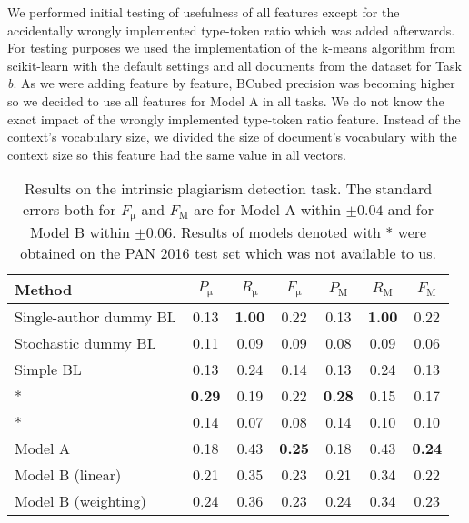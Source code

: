 \documentclass[10pt, a4paper]{article}
\begin{document}
We performed initial testing of usefulness of all features except for the accidentally wrongly implemented type-token ratio which was added afterwards. For testing purposes we used the implementation of the k-means algorithm from scikit-learn with the default settings and all documents from the dataset for Task \emph{b}. As we were adding feature by feature, BCubed precision was becoming higher so we decided to use all features for Model A in all tasks. We do not know the exact impact of the wrongly implemented type-token ratio feature. Instead of the context's vocabulary size, we divided the size of document's vocabulary with the context size so this feature had the same value in all vectors.

\begin{table*}
	\caption{Results on the intrinsic plagiarism detection task. The standard errors both for $F_\mathrm{\mu}$ and $F_\mathrm{M}$ are for Model A within $\pm0.04$ and for Model B within $\pm0.06$. Results of models denoted with * were obtained on the PAN 2016 test set which was not available to us.}
	\label{tab:results-task-a}
	\begin{center}
		\begin{tabular}{l|ccc|ccc}
			\toprule
			Method & $P_\mathrm{\mu}$ & $R_\mathrm{\mu}$ & $F_\mathrm{\mu}$ & $P_\mathrm{M}$ & $R_\mathrm{M}$ & $F_\mathrm{M}$\\
			\midrule
			Single-author dummy BL 	& 0.13 & \textbf{1.00} & 0.22 & 0.13 & \textbf{1.00} & 0.22 \\
			Stochastic dummy BL 	& 0.11 & 0.09 & 0.09 & 0.08 & 0.09 & 0.06 \\
			Simple BL 				& 0.13 & 0.24 & 0.14 & 0.13 & 0.24 & 0.13 \\
			\midrule
			\citet{kuznetsov-2016}* 	& \textbf{0.29} & 0.19 & 0.22 & \textbf{0.28} & 0.15 & 0.17 \\
			\citet{sittar-2016}* 	& 0.14 & 0.07 & 0.08 & 0.14 & 0.10 & 0.10 \\
			\midrule			
			Model A 				& 0.18 & 0.43 & \textbf{0.25} & 0.18 & 0.43 & \textbf{0.24} \\			
			Model B (linear) 		& 0.21 & 0.35 & 0.23 & 0.21 & 0.34 & 0.22 \\
			Model B (weighting) 	& 0.24 & 0.36 & 0.23 & 0.24 & 0.34 & 0.23 \\
			\bottomrule
		\end{tabular}
	\end{center}
\end{table*}
\end{document}
